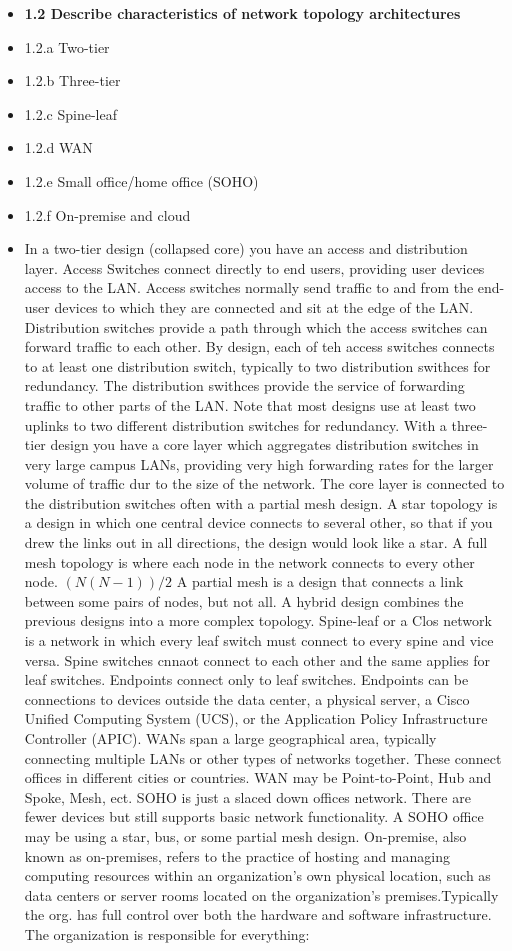 \documentclass{article}
\begin{document}
\begin{itemize}
  \item \textbf{1.2 Describe characteristics of network topology architectures}
  \item 1.2.a Two-tier
  \item 1.2.b Three-tier
  \item 1.2.c Spine-leaf
  \item 1.2.d WAN
  \item 1.2.e Small office/home office (SOHO)
  \item 1.2.f On-premise and cloud
  	\item[] In a two-tier design (collapsed core) you have an access and distribution layer. Access Switches connect directly to end users, providing user devices access to the LAN. Access switches normally send traffic to and from the end-user devices to which they are connected and sit at the edge of the LAN. Distribution switches provide a path through which the access switches can forward traffic to each other. By design, each of teh access switches connects to at least one distribution switch, typically to two distribution swithces for redundancy. The distribution swithces provide the service of forwarding traffic to other parts of the LAN. Note that most designs use at least two uplinks to two different distribution switches for redundancy. With a three-tier design you have a core layer which aggregates distribution switches in very large campus LANs, providing very high forwarding rates for the larger volume of traffic dur to the size of the network. The core layer is connected to the distribution switches often with a partial mesh design. A star topology is a design in which one central device connects to several other, so that if you drew the links out in all directions, the design would look like a star. A full mesh topology is where each node in the network connects to every other node. $(N(N-1))/2$ A partial mesh is a design that connects a link between some pairs of nodes, but not all. A hybrid design combines the previous designs into a more complex topology. Spine-leaf or a Clos network is a network in which every leaf switch must connect to every spine and vice versa. Spine switches cnnaot connect to each other and the same applies for leaf switches. Endpoints connect only to leaf switches. Endpoints can be connections to devices outside the data center, a physical server, a Cisco Unified Computing System (UCS), or the Application Policy Infrastructure Controller (APIC). WANs span a large geographical area, typically connecting multiple LANs or other types of networks together. These connect offices in different cities or countries. WAN may be Point-to-Point, Hub and Spoke, Mesh, ect. SOHO is just a slaced down offices network. There are fewer devices but still supports basic network functionality. A SOHO office may be using a star, bus, or some partial mesh design. On-premise, also known as on-premises, refers to the practice of hosting and managing computing resources within an organization's own physical location, such as data centers or server rooms located on the organization's premises.Typically the org. has full control over both the hardware and software infrastructure. The organization is responsible for everything: 
\end{itemize}
\end{document}
